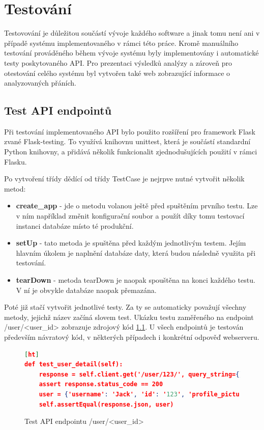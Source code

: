 \documentclass[thesis=B,czech]{FITthesis}[2012/06/26]
\begin{document}
\chapter{Testování}
\label{testovani}
Testovování je důležitou součástí vývoje každého software a jinak tomu není ani v případě systému implementovaného v rámci této práce. Kromě manuálního testování prováděného během vývoje systému byly implementovány i automatické testy poskytovaného API. Pro prezentaci výsledků analýzy a zároveň pro otestování celého systému byl vytvořen také web zobrazující informace o analyzovaných přáních. 


\section{Test API endpointů}
\label{api-testing}
Při testování implementovaného API bylo použito rozšíření pro framework Flask zvané Flask-testing. To využívá knihovnu unittest, která je součástí standardní Python knihovny, a přidává několik funkcionalit zjednodušujících použití v rámci Flasku. 

Po vytvoření třídy dědící od třídy TestCase je nejrpve nutné vytvořit několik metod:

\begin{itemize}
\item \textbf{create\_app} - jde o metodu volanou ještě před spuštěním prvního testu. Lze v ním například změnit konfigurační soubor a použít díky tomu testovací instanci databáze místo té produkční. 
\item \textbf{setUp} - tato metoda je spuštěna před každým jednotlivým testem. Jejím hlavním úkolem je naplnění databáze daty, která budou následně využita při testování. 
\item \textbf{tearDown} - metoda tearDown je naopak spouštěna na konci každého testu. V ní je obvykle databáze naopak přemazána. 
\end{itemize}

Poté již stačí vytvořit jednotlivé testy. Za ty se automaticky považují všechny metody, jejichž název začíná slovem test. Ukázku testu zaměřeného na endpoint /user/<user\_id> zobrazuje zdrojový kód \ref{user-test}. U všech endpointů je testován především návratový kód, v některých případech i konkrétní odpověď webserveru. 
\begin{figure}
\begin{lstlisting}[language=json,firstnumber=1][ht]
def test_user_detail(self):
	response = self.client.get('/user/123/', query_string={})
	assert response.status_code == 200
	user = {'username': 'Jack', 'id': '123', 'profile_picture_url': 'http://profile.picture.url'}
	self.assertEqual(response.json, user)
\end{lstlisting}
\caption{Test API endpointu /user/<user\_id>}
\label{user-test}
\end{figure} 
\end{document}
